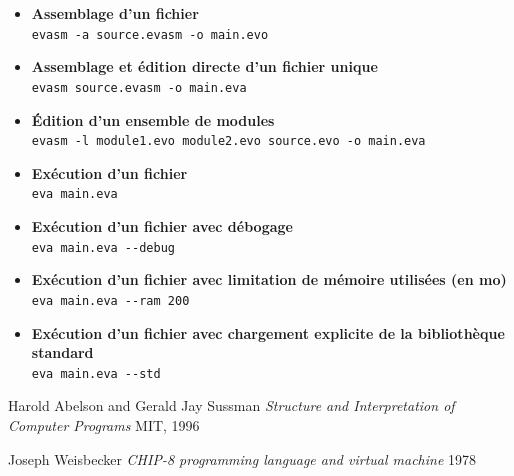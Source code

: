 \documentclass[11pt,twoside]{article}
\begin{document}
\begin{itemize}
  \item \textbf{Assemblage d'un fichier} \\
        \lstinline$evasm -a source.evasm -o main.evo$

  \item \textbf{Assemblage et édition directe d'un fichier unique} \\
        \lstinline$evasm source.evasm -o main.eva$

  \item \textbf{Édition d'un ensemble de modules} \\
        \lstinline$evasm -l module1.evo module2.evo source.evo -o main.eva$

  \item \textbf{Exécution d'un fichier} \\
        \lstinline$eva main.eva$

  \item \textbf{Exécution d'un fichier avec débogage} \\
        \lstinline$eva main.eva --debug$

  \item \textbf{Exécution d'un fichier avec limitation de mémoire utilisées (en mo)} \\
        \lstinline$eva main.eva --ram 200$

  \item \textbf{Exécution d'un fichier avec chargement explicite de la bibliothèque standard} \\
        \lstinline$eva main.eva --std$
\end{itemize}


\newpage{}

\clearpage{}

\begin{thebibliography}{XXXXXX}
  \label{chap:bib}

   Harold Abelson and Gerald Jay Sussman
  \emph{Structure and Interpretation of Computer Programs} MIT, 1996

   Joseph Weisbecker
  \emph{CHIP-8 programming language and virtual machine} 1978

\end{thebibliography}
\end{document}
